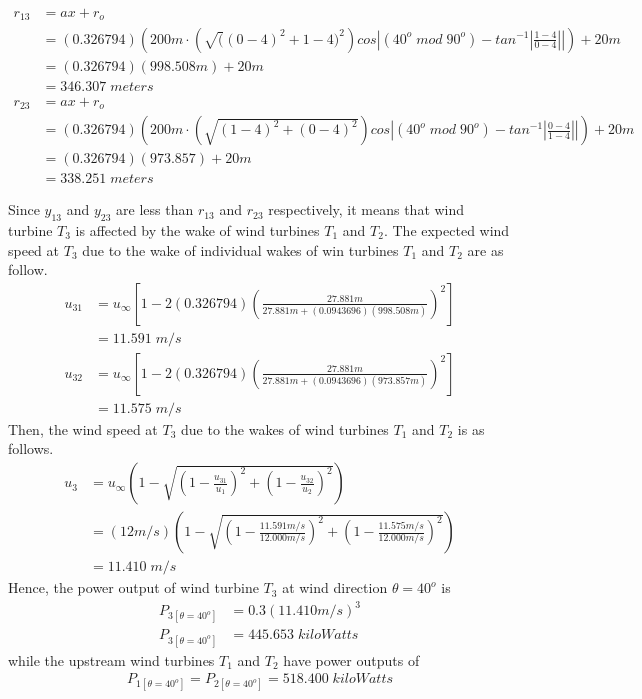     \begin{align*}
        r_{13}
        &= ax+r_o \\
        &= (0.326794)\left( 200m\cdot \left( \sqrt((0-4)^2+{1-4)^2} \right)cos \left| (40^o\;mod\;90^o) - tan^{-1}\left|\frac{1-4}{0-4}\right| \right| \right) + 20m \\
        &=(0.326794)(998.508m)+20m \\
        &= 346.307\;meters
    \end{align*}
    \begin{align*}
        r_{23}
        &= ax+r_o \\
        &= (0.326794)\left( 200m\cdot \left( \sqrt{(1-4)^2+(0-4)^2} \right)cos \left| (40^o\;mod\;90^o) - tan^{-1}\left|\frac{0-4}{1-4}\right| \right| \right) + 20m \\
        &=(0.326794)(973.857)+20m \\
        &= 338.251\;meters
    \end{align*}
    
    Since $y_{13}$ and $y_{23}$ are less than $r_{13}$ and $r_{23}$ respectively, it means that wind turbine $T_3$ is affected by the wake of wind turbines $T_1$ and $T_2$. The expected wind speed at $T_3$ due to the wake of individual wakes of win turbines $T_1$ and $T_2$ are as follow.
    \begin{align*}
        u_{31} &= u_\infty \left[ 1-2(0.326794)\left( \frac{27.881m}{27.881m+(0.0943696) (998.508m)} \right)^2 \right] \\
        &=11.591\;m/s
    \end{align*}
    \begin{align*}
        u_{32} &= u_\infty \left[ 1-2(0.326794)\left( \frac{27.881m}{27.881m+(0.0943696) (973.857m)} \right)^2 \right] \\
        &=11.575\;m/s
    \end{align*}
    Then, the wind speed at $T_3$ due to the wakes of wind turbines $T_1$ and $T_2$ is as follows.
    \begin{align*}
        u_3 &= u_\infty\left( 1-\sqrt{\left( 1-\frac{u_{31}}{u_1} \right)^2 + \left( 1-\frac{u_{32}}{u_2} \right)^2} \right) \\
        &= (12m/s)\left( 1-\sqrt{\left( 1-\frac{11.591m/s}{12.000m/s} \right)^2 + \left( 1-\frac{11.575m/s}{12.000m/s} \right)^2} \right) \\
        &= 11.410\;m/s
    \end{align*}
    Hence, the power output of wind turbine $T_3$ at wind direction $\theta=40^o$ is
    \begin{align*}
        P_{3[\theta=40^o]} &= 0.3(11.410m/s)^3 \\
        P_{3[\theta=40^o]} &= 445.653\;kiloWatts
    \end{align*}
    while the upstream wind turbines $T_1$ and $T_2$ have power outputs of
    \begin{align*}
        P_{1[\theta=40^o]}=P_{2[\theta=40^o]} = 518.400\;kiloWatts
    \end{align*}